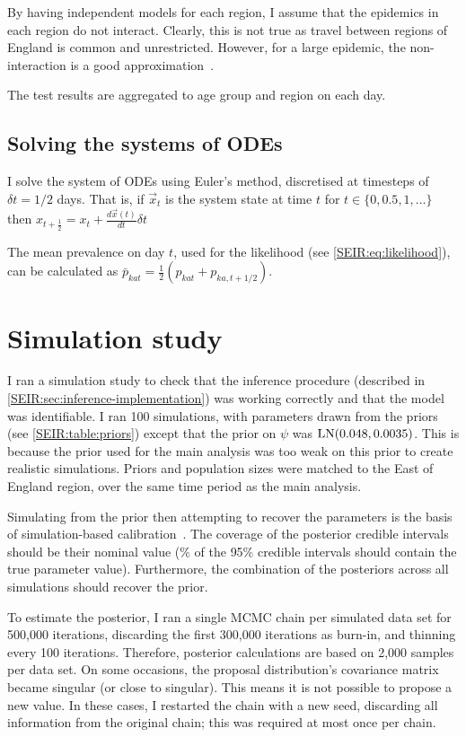 \documentclass[thesis.tex]{subfiles}
\begin{document}
By having independent models for each region, I assume that the epidemics in each region do not interact.
Clearly, this is not true as travel between regions of England is common and unrestricted.
However, for a large epidemic, the non-interaction is a good approximation~\autocite{birrellRealtimea}.

The test results are aggregated to age group and region on each day.

\subsection{Solving the systems of ODEs} \label{SEIR:sec:solving-ODEs}
I solve the system of ODEs using Euler's method, discretised at timesteps of $\delta t = 1/2$ days.
That is, if $\vec{x}_t$ is the system state at time $t$ for $t \in \{ 0, 0.5, 1, \dots \}$ then $x_{t+\frac{1}{2}} = x_t + \frac{d\vec{x}(t)}{dt} \delta t$

The mean prevalence on day $t$, used for the likelihood (see \cref{SEIR:eq:likelihood}), can be calculated as $\bar{p}_{kat} = \frac{1}{2} ( p_{kat} + p_{ka,t+1/2} )$.

\section{Simulation study} \label{SEIR:sec:sim-study}
I ran a simulation study to check that the inference procedure (described in \cref{SEIR:sec:inference-implementation}) was working correctly and that the model was identifiable.
I ran 100 simulations, with parameters drawn from the priors (see \cref{SEIR:table:priors}) except that the prior on $\psi$ was $\operatorname{LN}(0.048, 0.0035)$.
This is because the prior used for the main analysis was too weak on this prior to create realistic simulations.
Priors and population sizes were matched to the East of England region, over the same time period as the main analysis.

Simulating from the prior then attempting to recover the parameters is the basis of simulation-based calibration~\autocites{cookValidation}{taltsValidating}.
The coverage of the posterior credible intervals should be their nominal value (\% of the 95\% credible intervals should contain the true parameter value).
Furthermore, the combination of the posteriors across all simulations should recover the prior.

To estimate the posterior, I ran a single MCMC chain per simulated data set for 500,000 iterations, discarding the first 300,000 iterations as burn-in, and thinning every 100 iterations.
Therefore, posterior calculations are based on 2,000 samples per data set.
On some occasions, the proposal distribution's covariance matrix became singular (or close to singular).
This means it is not possible to propose a new value.
In these cases, I restarted the chain with a new seed, discarding all information from the original chain; this was required at most once per chain.
\end{document}
